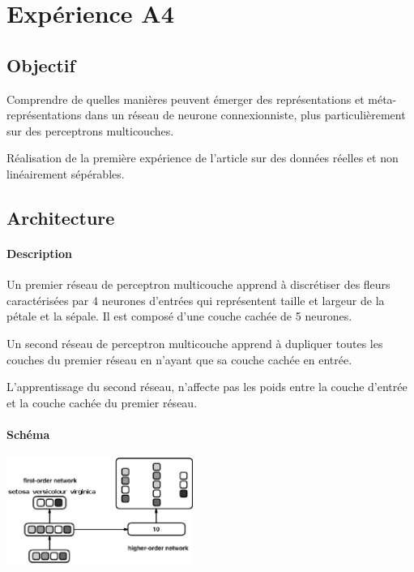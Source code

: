 \section{Expérience A4} \label{expA4}
  \subsection{Objectif}
    Comprendre de quelles manières peuvent émerger des représentations et méta-représentations dans 
    un réseau de neurone connexionniste, plus particulièrement sur des perceptrons multicouches.
    
    Réalisation de la première expérience de l'article \cite{Cleeremans_2007} sur des données réelles
    et non linéairement sépérables.

  
  \subsection{Architecture}
    \paragraph{Description}
      Un premier réseau de perceptron multicouche apprend à discrétiser des fleurs caractérisées
      par 4 neurones d'entrées qui représentent taille et largeur de la pétale et la sépale. 
      Il est composé d'une couche cachée de 5 neurones.
      
      Un second réseau de perceptron multicouche apprend à dupliquer toutes les couches du premier
      réseau en n'ayant que sa couche cachée en entrée.
      
      L'apprentissage du second réseau, n'affecte pas les poids entre la couche d'entrée et la 
      couche cachée du premier réseau.

    \paragraph{Schéma}
      \begin{center}
	\includegraphics[width=230px]{data/expA4/schema.png}
      \end{center}
      
